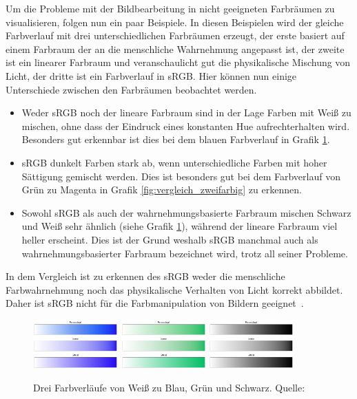 \documentclass[12pt, a4paper, ngerman]{article}
\begin{document}
Um die Probleme mit der Bildbearbeitung in nicht geeigneten Farbräumen zu visualisieren, folgen nun ein paar Beispiele. 
In diesen Beispielen wird der gleiche Farbverlauf mit drei unterschiedlichen Farbräumen erzeugt, 
der erste basiert auf einem Farbraum der an die menschliche Wahrnehmung angepasst ist, 
der zweite ist ein linearer Farbraum und veranschaulicht gut die physikalische Mischung von Licht, 
der dritte ist ein Farbverlauf in sRGB.
Hier können nun einige Unterschiede zwischen den Farbräumen beobachtet werden.
\begin{itemize}
  \item Weder sRGB noch der lineare Farbraum sind in der Lage Farben mit Weiß zu mischen, ohne dass der Eindruck eines konstanten Hue aufrechterhalten wird. Besonders gut erkennbar ist dies bei dem blauen Farbverlauf in Grafik \ref{fig:vergleich_white}.
  \item sRGB dunkelt Farben stark ab, wenn unterschiedliche Farben mit hoher Sättigung gemischt werden. Dies ist besonders gut bei dem Farbverlauf von Grün zu Magenta in Grafik \ref{fig:vergleich_zweifarbig} zu erkennen.
  \item Sowohl sRGB als auch der wahrnehmungsbasierte Farbraum mischen Schwarz und Weiß sehr ähnlich (siehe Grafik \ref{fig:vergleich_white}), während der lineare Farbraum viel heller erscheint. Dies ist der Grund weshalb sRGB manchmal auch als wahrnehmungsbasierter Farbraum bezeichnet wird, trotz all seiner Probleme.
\end{itemize}
In dem Vergleich ist zu erkennen des sRGB weder die menschliche Farbwahrnehmung 
noch das physikalische Verhalten von Licht korrekt abbildet.
Daher ist sRGB nicht für die Farbmanipulation von Bildern geeignet~\cite{Ottosson_2020}.

\begin{figure}
  \centering
  \includegraphics[width=0.29\textwidth]{Grafiken/Farbverlauf/whiteblue.png}
  \includegraphics[width=0.29\textwidth]{Grafiken/Farbverlauf/whitegreen.png}
  \includegraphics[width=0.29\textwidth]{Grafiken/Farbverlauf/whiteblack.png}
  \caption{Drei Farbverläufe von Weiß zu Blau, Grün und Schwarz. Quelle:~\cite{Ottosson_2020}}
  \label{fig:vergleich_white}
\end{figure}
\end{document}
